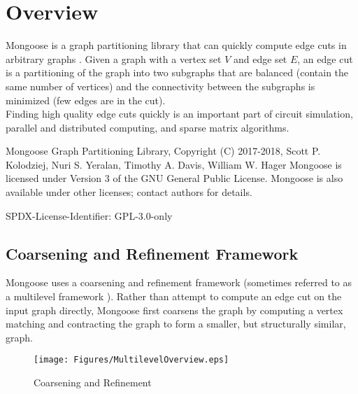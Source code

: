 \documentclass[letter]{article}
\begin{document}
\maketitle

\tableofcontents

\newpage

\section{Overview}
Mongoose is a graph partitioning library that can quickly compute edge cuts in arbitrary graphs \cite{MongooseTOMS}. Given a graph with a vertex set $V$ and edge set $E$, an edge cut is a partitioning of the graph into two subgraphs that are balanced (contain the same number of vertices) and the connectivity between the subgraphs is minimized (few edges are in the cut).
\\

Finding high quality edge cuts quickly is an important part of circuit simulation, parallel and distributed computing, and sparse matrix algorithms.


 Mongoose Graph Partitioning Library, Copyright (C) 2017-2018,
 Scott P. Kolodziej, Nuri S. Yeralan, Timothy A. Davis, William W. Hager
 Mongoose is licensed under Version 3 of the GNU General Public License.
 Mongoose is also available under other licenses; contact authors for details.

SPDX-License-Identifier: GPL-3.0-only

\subsection{Coarsening and Refinement Framework}

Mongoose uses a coarsening and refinement framework (sometimes referred to as a multilevel framework \cite{HendricksonLeland1995, KarypisKumar1995}). Rather than attempt to compute an edge cut on the input graph directly, Mongoose first coarsens the graph by computing a vertex matching and contracting the graph to form a smaller, but structurally similar, graph.

\begin{figure}[!ht] 
\begin{center} 
    \texttt{[image: Figures/MultilevelOverview.eps]} 
    \caption{Coarsening and Refinement} 
\end{center} 
\end{figure} 
\end{document}
